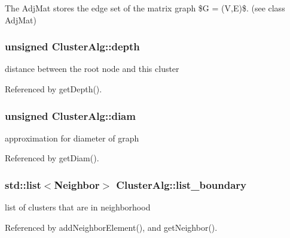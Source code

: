 \label{classClusterAlg_a29eb1ed447fe956fbece857e0ab898bc}
\-The \-Adj\-Mat stores the edge set of the matrix graph \$\-G = (\-V,\-E)\$. (see class \-Adj\-Mat) \hypertarget{classClusterAlg_ac06ccb0ba85be10e97392bd063fa78c8}{
\subsubsection[{depth}]{\setlength{\rightskip}{0pt plus 5cm}unsigned {\bf \-Cluster\-Alg\-::depth}}}
\label{classClusterAlg_ac06ccb0ba85be10e97392bd063fa78c8}
distance between the root node and this cluster 

\-Referenced by get\-Depth().

\hypertarget{classClusterAlg_a38f91e914760de5e80a8023e5bb644bf}{
\subsubsection[{diam}]{\setlength{\rightskip}{0pt plus 5cm}unsigned {\bf \-Cluster\-Alg\-::diam}}}
\label{classClusterAlg_a38f91e914760de5e80a8023e5bb644bf}
approximation for diameter of graph 

\-Referenced by get\-Diam().

\hypertarget{classClusterAlg_ace012e3a54a91c88fb486b7e02394d39}{
\subsubsection[{list\-\_\-boundary}]{\setlength{\rightskip}{0pt plus 5cm}std\-::list$<$\-Neighbor$>$ {\bf \-Cluster\-Alg\-::list\-\_\-boundary}}}
\label{classClusterAlg_ace012e3a54a91c88fb486b7e02394d39}
list of clusters that are in neighborhood 

\-Referenced by add\-Neighbor\-Element(), and get\-Neighbor().

